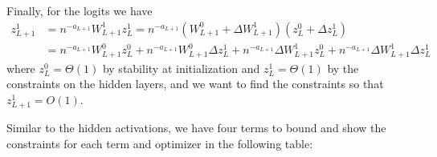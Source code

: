 \begingroup
\renewcommand{\arraystretch}{2.5}
\begin{table}[h!]
\centering
{}
\end{table}
\endgroup
\FloatBarrier
Finally, for the logits we have
\begin{align*}
    z_{L+1}^1 &= n^{-a_{L+1}}W_{L+1}^1 z_{L}^1 = n^{-a_{L+1}}(W_{L+1}^0 + \Delta W_{L+1}^1)(z_{L}^0 + \Delta z_{L}^1)\\
    &= n^{-a_{L+1}}W_{L+1}^0 z_{L}^0 + n^{-a_{L+1}}W_{L+1}^0 \Delta z_{L}^1 + n^{-a_{L+1}}\Delta W_{L+1}^1 z_{L}^0 + n^{-a_{L+1}}\Delta W_{L+1}^1 \Delta z_{L}^1
\end{align*}
where $z_L^0 = \Theta(1)$ by stability at initialization and $z_L^1 = \Theta(1)$ by the constraints on the hidden layers, and we want to find the constraints so that $z_{L+1}^1 = O(1)$.

Similar to the hidden activations, we have four terms to bound and show the constraints for each term and optimizer in the following table:

